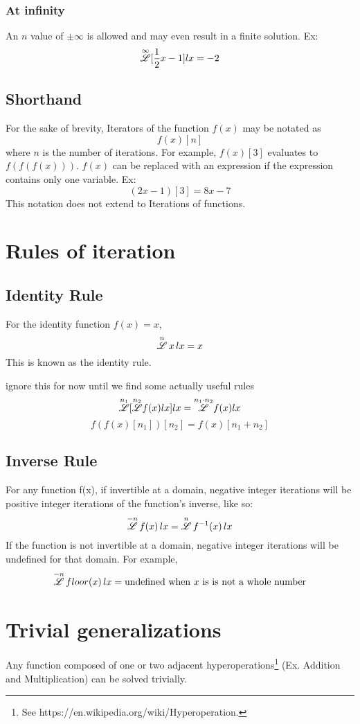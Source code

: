 \documentclass[12pt, letterpaper]{article}
\begin{document}
\subsubsection{At infinity}
An $n$ value of $\pm\infty$ is allowed and may even result in a finite solution. Ex:
$$\overset{\infty}{\mathscr{L}} [\frac{1}{2}x - 1] lx = -2$$

\subsection{Shorthand}
For the sake of brevity, Iterators of the function $f(x)$ may be notated as
$$f(x)[n]$$ 
where $n$ is the number of iterations. For example, $f(x)[3]$ evaluates to $f(f(f(x)))$. $f(x)$ can be replaced with an expression if the expression contains only one variable. Ex:
$$(2x-1)[3] = 8x-7$$
This notation does not extend to Iterations of functions.

\section{Rules of iteration}

\subsection{Identity Rule}
For the identity function $f(x) = x$, 
\[
\overset{n}{\mathscr{L}} \, x \, lx = x
\]
This is known as the identity rule.

ignore this for now until we find some actually useful rules
$$\overset{n_1}{\mathscr{L}}[\overset{n_2}{\mathscr{L}} f(x) lx] lx = \overset{n_1\cdot n_2}{\mathscr{L}} f(x) lx$$
$$f(f(x)[n_1])[n_2] = f(x)[n_1+n_2]$$

\subsection{Inverse Rule}
For any function f(x), if invertible at a domain, negative integer iterations will be positive integer iterations of the function's inverse, like so:
\[
\overset{-n}{\mathscr{L}} \, f(x) \, lx = \overset{n}{\mathscr{L}} \, f^{-1}(x) \, lx
\]
If the function is not invertible at a domain, negative integer iterations will be undefined for that domain. For example,
$$\overset{-n}{\mathscr{L}} \, floor(x) \, lx = \text{undefined when $x$ is is not a whole number}$$


\section{Trivial generalizations}
Any function composed of one or two adjacent hyperoperations\footnote{See https://en.wikipedia.org/wiki/Hyperoperation.} (Ex. Addition and Multiplication) can be solved trivially.
\end{document}
